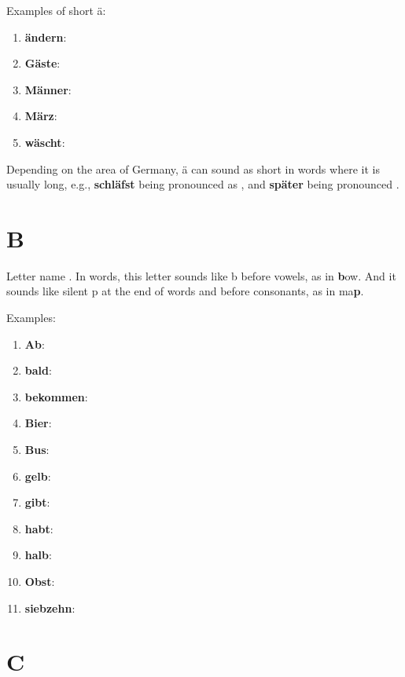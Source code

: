 Examples of short ä:
\begin{enumerate}
    \item \textbf{ändern}: \textipa{["End@rn]}
    \item \textbf{Gäste}: \textipa{["gEst@]}
    \item \textbf{Männer}: \textipa{["mEn@r]}
    \item \textbf{März}: \textipa{[mErts]}
    \item \textbf{wäscht}: \textipa{[vESt]}
\end{enumerate}

Depending on the area of Germany, ä can sound as short in words where it is usually long, e.g., \textbf{schläfst} being pronounced as \textipa{["SlEfst]}, and \textbf{später} being pronounced \textipa{["SpEt@r]}.

\section*{B}

Letter name \textipa{[be:]}. In words, this letter sounds like b before vowels, as in \textbf{b}ow. And it sounds like silent p at the end of words and before consonants, as in ma\textbf{p}.

Examples:
\begin{enumerate}
    \item \textbf{Ab}: \textipa{[ap]}
    \item \textbf{bald}: \textipa{[balt]}
    \item \textbf{bekommen}: \textipa{[be"kOm@n]}
    \item \textbf{Bier}: \textipa{[bi:r]}
    \item \textbf{Bus}: \textipa{[bUs]}
    \item \textbf{gelb}: \textipa{[gElp]}
    \item \textbf{gibt}: \textipa{[gIpt]}
    \item \textbf{habt}: \textipa{[hapt]}
    \item \textbf{halb}: \textipa{[halp]}
    \item \textbf{Obst}: \textipa{[o:pst]}
    \item \textbf{siebzehn}: \textipa{["zi:ptse:n]}
\end{enumerate}

\section*{C}

